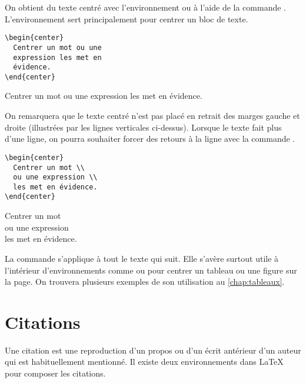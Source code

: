 On obtient du texte centré avec l'environnement  ou à
l'aide de la commande \cmd{\centering}. L'environnement sert
principalement pour centrer un bloc de texte.
\begin{demo}
  \begin{eqxample}
\begin{lstlisting}
\begin{center}
  Centrer un mot ou une
  expression les met en
  évidence.
\end{center}
\end{lstlisting}
    \producing
\begin{center}
  Centrer un mot ou une expression
  les met en évidence.
\end{center}
  \end{eqxample}
\end{demo}
On remarquera que le texte centré n'est pas placé en retrait des
marges gauche et droite (illustrées par les lignes verticales
ci-dessus). Lorsque le texte fait plus d'une ligne, on pourra
souhaiter forcer des retours à la ligne avec la commande {\bs\bs}.
\begin{demo}
  \begin{eqxample}
\begin{lstlisting}
\begin{center}
  Centrer un mot \\
  ou une expression \\
  les met en évidence.
\end{center}
\end{lstlisting}
    \producing
\begin{center}
  Centrer un mot \\
  ou une expression \\
  les met en évidence.
\end{center}
  \end{eqxample}
\end{demo}

La commande \cmd{\centering} s'applique à tout le texte qui suit. Elle
s'avère surtout utile à l'intérieur d'environnements comme 
ou  pour centrer un tableau ou une figure sur la page. On
trouvera plusieurs exemples de son utilisation
au \autoref{chap:tableaux}.


\section{Citations}
\label{sec:apparence:citations}

Une citation est une reproduction d'un propos ou d'un écrit antérieur
d'un auteur qui est habituellement mentionné. Il existe deux
environnements dans {\LaTeX} pour composer les citations.

